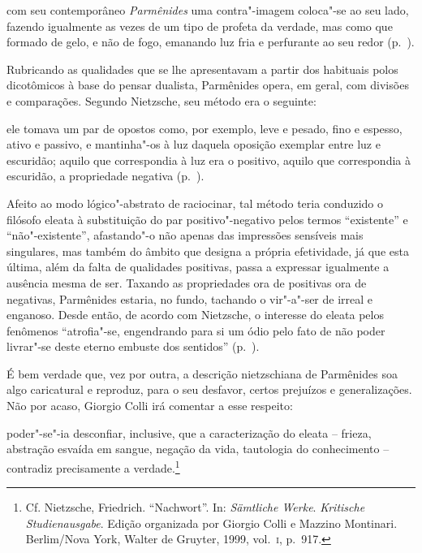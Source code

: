\begin{hedraquote} 
com seu contemporâneo \textit{Parmênides} uma
contra"-imagem coloca"-se ao seu lado, fazendo igualmente as vezes de um
tipo de profeta da verdade, mas como que formado de gelo, e não de
fogo, emanando luz fria e perfurante ao seu
redor (p.~\pageref{comseucontemporaneo}).
\end{hedraquote} 

Rubricando as qualidades que se lhe apresentavam a partir dos habituais
polos dicotômicos à base do pensar dualista, Parmênides opera, em
geral, com divisões e comparações. Segundo Nietzsche, seu método era o
seguinte: 

\begin{hedraquote} 
ele tomava um par de opostos como, por
exemplo, leve e pesado, fino e espesso, ativo e passivo, e mantinha"-os
à luz daquela oposição exemplar entre luz e escuridão; aquilo que
correspondia à luz era o positivo, aquilo que correspondia à escuridão,
a propriedade negativa (p.~\pageref{eletomavaumpar}).
\end{hedraquote} 

Afeito ao modo lógico"-abstrato de raciocinar, tal método teria
conduzido o filósofo eleata à substituição do par positivo"-negativo
pelos termos ``existente'' e
``não"-existente'', afastando"-o não apenas das
impressões sensíveis mais singulares, mas também do âmbito que designa
a própria efetividade, já que esta última, além da falta de qualidades
positivas, passa a expressar igualmente a ausência mesma de ser.
Taxando as propriedades ora de positivas ora de negativas, Parmênides
estaria, no fundo, tachando o vir"-a"-ser de irreal e enganoso. Desde
então, de acordo com Nietzsche, o interesse do eleata pelos fenômenos
``atrofia"-se, engendrando para si um ódio pelo fato de não
poder livrar"-se deste eterno embuste dos
sentidos'' (p.~\pageref{odio}).

É bem verdade que, vez por outra, a descrição nietzschiana de Parmênides
soa algo caricatural e reproduz, para o seu desfavor, certos prejuízos
e generalizações. Não por acaso, Giorgio Colli irá comentar a esse respeito: 
\begin{hedraquote} 
poder"-se"-ia desconfiar, inclusive, que a caracterização do	\label{colli}
eleata -- frieza, abstração esvaída em sangue, negação da vida,
tautologia do conhecimento -- contradiz precisamente a
verdade.\footnote{ Cf. Nietzsche, Friedrich. ``Nachwort''. In:
\textit{Sämtliche Werke}. \textit{\mbox{Kritische} Studienausgabe}. Edição
organizada por Giorgio Colli e Mazzino Montinari. Berlim/Nova York,
Walter de Gruyter, 1999, vol.~\textsc{i}, p.~917.} 
\end{hedraquote} 

